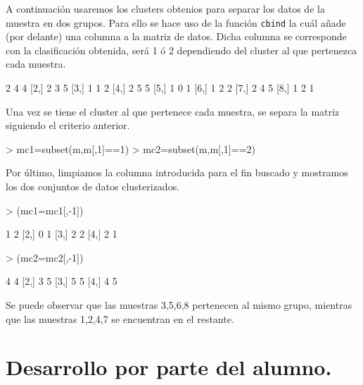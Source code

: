 \documentclass [a4paper] {article}
\begin{document}
\bigskip
A continuación usaremos los clusters obtenios para separar los datos de la muestra en dos grupos. Para ello
se hace uso de la función \texttt{cbind} la cuál añade (por delante) una columna a la matriz de datos. Dicha
columna se corresponde con la clasificación obtenida, será 1 ó 2 dependiendo del cluster al que pertenezca
cada muestra.
\begin{Schunk}
\begin{Soutput}
     [,1] [,2] [,3]
[1,]    2    4    4
[2,]    2    3    5
[3,]    1    1    2
[4,]    2    5    5
[5,]    1    0    1
[6,]    1    2    2
[7,]    2    4    5
[8,]    1    2    1
\end{Soutput}
\end{Schunk}

\bigskip
Una vez se tiene el cluster al que pertenece cada muestra, se separa la matriz siguiendo el criterio anterior.
\begin{Schunk}
\begin{Sinput}
> mc1=subset(m,m[,1]==1)
> mc2=subset(m,m[,1]==2)
\end{Sinput}
\end{Schunk}

\bigskip
Por último, limpiamos la columna introducida para el fin buscado y mostramos los dos conjuntos de datos
clusterizados.
\begin{Schunk}
\begin{Sinput}
> (mc1=mc1[,-1])
\end{Sinput}
\begin{Soutput}
     [,1] [,2]
[1,]    1    2
[2,]    0    1
[3,]    2    2
[4,]    2    1
\end{Soutput}
\begin{Sinput}
> (mc2=mc2[,-1])
\end{Sinput}
\begin{Soutput}
     [,1] [,2]
[1,]    4    4
[2,]    3    5
[3,]    5    5
[4,]    4    5
\end{Soutput}
\end{Schunk}

\bigskip
Se puede observar que las muestras 3,5,6,8 pertenecen al mismo grupo, mientras que las muestras 1,2,4,7 
se encuentran en el restante.

\section{Desarrollo por parte del alumno.}
\end{document}
